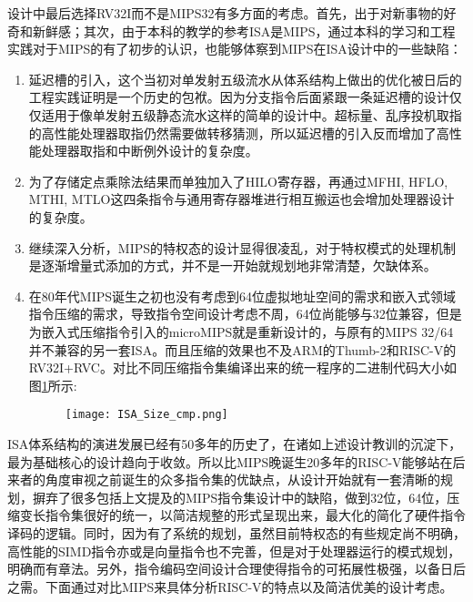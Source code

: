 设计中最后选择RV32I而不是MIPS32有多方面的考虑。首先，出于对新事物的好奇和新鲜感；其次，由于本科的教学的参考ISA是MIPS，通过本科的学习和工程实践对于MIPS的有了初步的认识，也能够体察到MIPS在ISA设计中的一些缺陷：
\begin{enumerate}[label=(\alph*)]
	\item 延迟槽的引入，这个当初对单发射五级流水从体系结构上做出的优化被日后的工程实践证明是一个历史的包袱。因为分支指令后面紧跟一条延迟槽的设计仅仅适用于像单发射五级静态流水这样的简单的设计中。超标量、乱序投机取指的高性能处理器取指仍然需要做转移猜测，所以延迟槽的引入反而增加了高性能处理器取指和中断例外设计的复杂度。
	\item 为了存储定点乘除法结果而单独加入了HILO寄存器，再通过MFHI, HFLO, MTHI, MTLO这四条指令与通用寄存器堆进行相互搬运也会增加处理器设计的复杂度。
	\item 继续深入分析，MIPS的特权态的设计显得很凌乱，对于特权模式的处理机制是逐渐增量式添加的方式，并不是一开始就规划地非常清楚，欠缺体系。
	\item 在80年代MIPS诞生之初也没有考虑到64位虚拟地址空间的需求和嵌入式领域指令压缩的需求，导致指令空间设计考虑不周，64位尚能够与32位兼容，但是为嵌入式压缩指令引入的microMIPS就是重新设计的，与原有的MIPS 32/64并不兼容的另一套ISA。而且压缩的效果也不及ARM的Thumb-2和RISC-V的RV32I+RVC。对比不同压缩指令集编译出来的统一程序的二进制代码大小如图\ref{fig:sizecmp}所示:
	\begin{figure}[!htbp]
		\centering
		\texttt{[image: ISA\_Size\_cmp.png]}
		\label{fig:sizecmp}
	\end{figure}
\end{enumerate}

ISA体系结构的演进发展已经有50多年的历史了，在诸如上述设计教训的沉淀下，最为基础核心的设计趋向于收敛。所以比MIPS晚诞生20多年的RISC-V能够站在后来者的角度审视之前诞生的众多指令集的优缺点，从设计开始就有一套清晰的规划，摒弃了很多包括上文提及的MIPS指令集设计中的缺陷，做到32位，64位，压缩变长指令集很好的统一，以简洁规整的形式呈现出来，最大化的简化了硬件指令译码的逻辑。同时，因为有了系统的规划，虽然目前特权态的有些规定尚不明确，高性能的SIMD指令亦或是向量指令也不完善，但是对于处理器运行的模式规划，明确而有章法。另外，指令编码空间设计合理使得指令的可拓展性极强，以备日后之需。下面通过对比MIPS来具体分析RISC-V的特点以及简洁优美的设计考虑。

